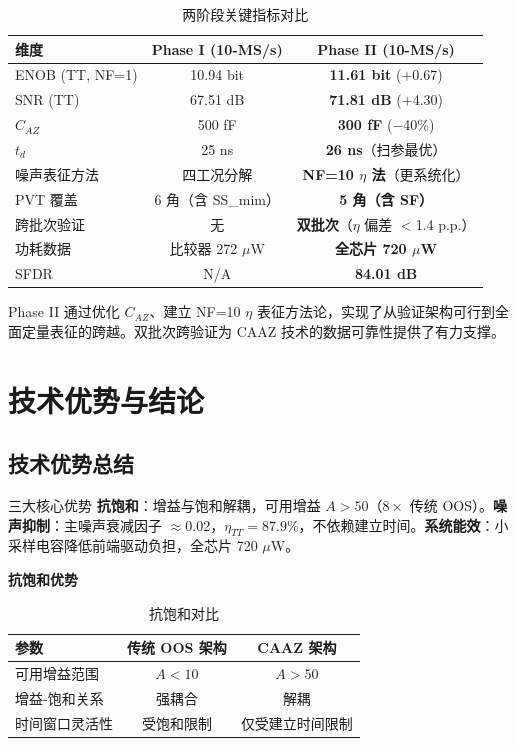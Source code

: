\documentclass[11pt,a4paper,UTF8]{ctexart}
\begin{document}
\begin{table}[htbp]\centering\caption{两阶段关键指标对比}\label{tab:evolution2}\small
\begin{tabular}{lcc}\toprule
\textbf{维度} & \textbf{Phase I (10-MS/s)} & \textbf{Phase II (10-MS/s)} \\\midrule
ENOB (TT, NF=1) & 10.94 bit & \textbf{11.61 bit} ($+$0.67) \\
SNR (TT) & 67.51 dB & \textbf{71.81 dB} ($+$4.30) \\
$C_{AZ}$ & 500 fF & \textbf{300 fF} ($-$40\%) \\
$t_d$ & 25 ns & \textbf{26 ns}（扫参最优） \\
噪声表征方法 & 四工况分解 & \textbf{NF=10 $\eta$ 法}（更系统化） \\
PVT 覆盖 & 6 角（含 SS\_mim） & \textbf{5 角（含 SF）} \\
跨批次验证 & 无 & \textbf{双批次}（$\eta$ 偏差 $<$1.4 p.p.） \\
功耗数据 & 比较器 272 $\mu$W & \textbf{全芯片 720 $\mu$W} \\
SFDR & N/A & \textbf{84.01 dB} \\\bottomrule
\end{tabular}
\end{table}

Phase II 通过优化 $C_{AZ}$、建立 NF=10 $\eta$ 表征方法论，实现了从验证架构可行到全面定量表征的跨越。双批次跨验证为 CAAZ 技术的数据可靠性提供了有力支撑。

\section{技术优势与结论}
\label{sec:conclusion}

\subsection{技术优势总结}

\begin{findbox}{三大核心优势}
\textbf{抗饱和}：增益与饱和解耦，可用增益 $A > 50$（$8\times$ 传统 OOS）。\textbf{噪声抑制}：主噪声衰减因子 $\approx$0.02，$\eta_{TT}=87.9\%$，不依赖建立时间。\textbf{系统能效}：小采样电容降低前端驱动负担，全芯片 720 $\mu$W。
\end{findbox}

\textbf{抗饱和优势}

\begin{table}[htbp]\centering\caption{抗饱和对比}\label{tab:anti-sat}\small
\begin{tabular}{lcc}\toprule
\textbf{参数} & \textbf{传统 OOS 架构} & \textbf{CAAZ 架构} \\\midrule
可用增益范围 & $A < 10$ & $A > 50$ \\
增益-饱和关系 & 强耦合 & 解耦 \\
时间窗口灵活性 & 受饱和限制 & 仅受建立时间限制 \\\bottomrule
\end{tabular}
\end{table}
\end{document}
